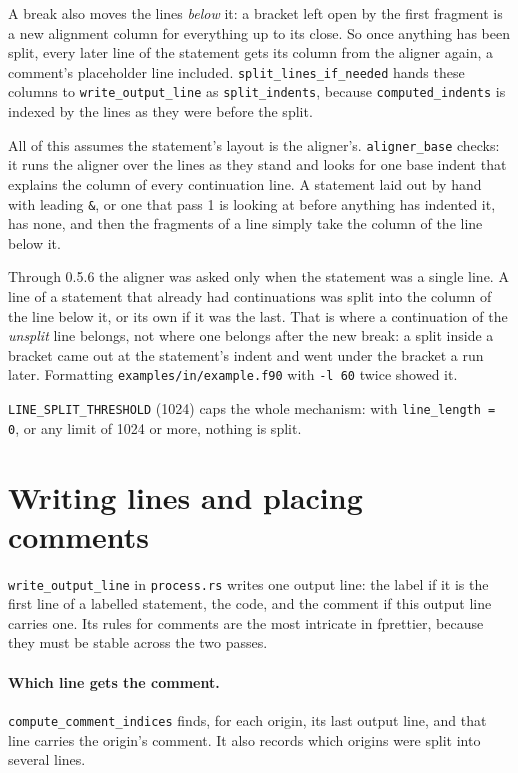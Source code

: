 \documentclass[11pt,a4paper,openany]{book}
\newcommand{\code}[1]{\texttt{\small #1}}
\newcommand{\file}[1]{\texttt{\small\color{accent}#1}}
\begin{document}
A break also moves the lines \emph{below} it: a bracket left open by the
first fragment is a new alignment column for everything up to its close. So
once anything has been split, every later line of the statement gets its
column from the aligner again, a comment's placeholder line included.
\code{split\_lines\_if\_needed} hands these columns to
\code{write\_output\_line} as \code{split\_indents}, because
\code{computed\_indents} is indexed by the lines as they were before the split.

All of this assumes the statement's layout is the aligner's.
\code{aligner\_base} checks: it runs the aligner over the lines as they stand
and looks for one base indent that explains the column of every continuation
line. A statement laid out by hand with leading \code{\&}, or one that pass 1
is looking at before anything has indented it, has none, and then the
fragments of a line simply take the column of the line below it.

\begin{pitfall}
Through 0.5.6 the aligner was asked only when the statement was a single line.
A line of a statement that already had continuations was split into the column
of the line below it, or its own if it was the last. That is where a
continuation of the \emph{unsplit} line belongs, not where one belongs after
the new break: a split inside a bracket came out at the statement's indent and
went under the bracket a run later. Formatting
\file{examples/in/example.f90} with \code{-l 60} twice showed it.
\end{pitfall}

\code{LINE\_SPLIT\_THRESHOLD} (1024) caps the whole mechanism: with
\code{line\_length = 0}, or any limit of 1024 or more, nothing is split.

\section{Writing lines and placing comments}

\code{write\_output\_line} in \file{process.rs} writes one output line: the
label if it is the first line of a labelled statement, the code, and the
comment if this output line carries one. Its rules for comments are the most
intricate in fprettier, because they must be stable across the two passes.

\paragraph{Which line gets the comment.} \code{compute\_comment\_indices}
finds, for each origin, its last output line, and that line carries the
origin's comment. It also records which origins were split into several lines.
\end{document}
